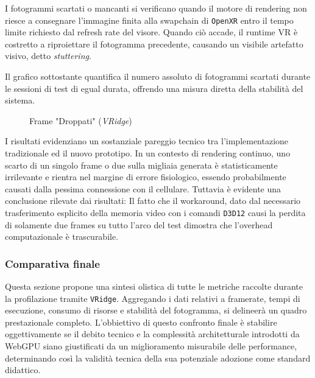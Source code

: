 \documentclass[a4paper, 11pt, twoside]{report}
\begin{document}
I fotogrammi scartati o mancanti si verificano quando il motore di rendering non riesce a consegnare l'immagine finita
alla swapchain di \texttt{\gls{OpenXR}} entro il tempo limite richiesto dal refresh rate del visore. Quando ciò accade,
il runtime VR è costretto a riproiettare il fotogramma precedente, causando un visibile artefatto visivo, detto
\textit{stuttering}.

Il grafico sottostante quantifica il numero assoluto di fotogrammi scartati durante le sessioni
di test di egual durata, offrendo una misura diretta della stabilità del sistema.

\begin{figure}[ht]
\centering
{}
\caption{Frame "Droppati" (\textit{VRidge})}
\end{figure}

I risultati evidenziano un sostanziale pareggio tecnico tra l'implementazione tradizionale ed il nuovo prototipo.
In un contesto di rendering continuo, uno scarto di un singolo frame o due sulla migliaia generata è statisticamente
irrilevante e rientra nel margine di errore fisiologico, essendo probabilmente causati dalla pessima connessione con
il cellulare. Tuttavia è evidente una conclusione rilevate dai risultati:
Il fatto che il workaround, dato dal necessario trasferimento esplicito della memoria video con i comandi \texttt{D3D12}
causi la perdita di solamente due frames su tutto l'arco del test dimostra che l'overhead computazionale è trascurabile.

\subsubsection{Comparativa finale}

Questa sezione propone una sintesi olistica di tutte le metriche raccolte durante la profilazione tramite
\texttt{VRidge}. Aggregando i dati relativi a \gls{framerate}, tempi di esecuzione, consumo di risorse e stabilità del
fotogramma, si delineerà un quadro prestazionale completo. L'obbiettivo di questo confronto finale è stabilire
oggettivamente se il debito tecnico e la complessità architetturale introdotti da WebGPU siano giustificati da un
miglioramento misurabile delle performance, determinando così la validità tecnica della sua potenziale adozione come
standard didattico.
\end{document}
